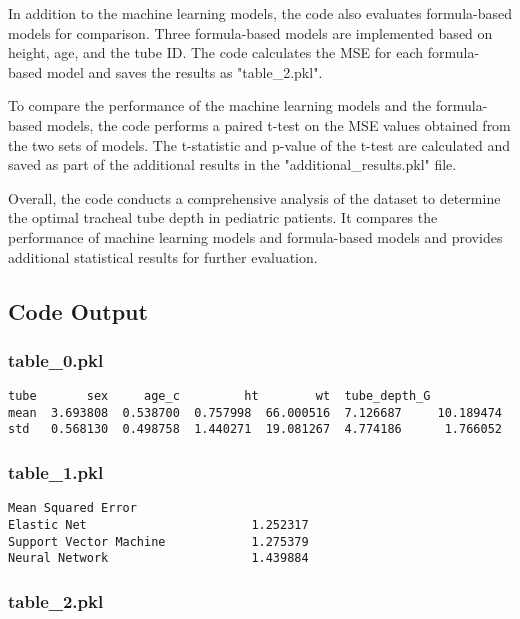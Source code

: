 \documentclass[11pt]{article}
\begin{document}
In addition to the machine learning models, the code also evaluates formula-based models for comparison. Three formula-based models are implemented based on height, age, and the tube ID. The code calculates the MSE for each formula-based model and saves the results as "table\_2.pkl".

To compare the performance of the machine learning models and the formula-based models, the code performs a paired t-test on the MSE values obtained from the two sets of models. The t-statistic and p-value of the t-test are calculated and saved as part of the additional results in the "additional\_results.pkl" file.

Overall, the code conducts a comprehensive analysis of the dataset to determine the optimal tracheal tube depth in pediatric patients. It compares the performance of machine learning models and formula-based models and provides additional statistical results for further evaluation.

\subsection{Code Output}

\subsubsection*{table\_0.pkl}

\begin{Verbatim}[tabsize=4]
          tube       sex     age_c         ht        wt  tube_depth_G
mean  3.693808  0.538700  0.757998  66.000516  7.126687     10.189474
std   0.568130  0.498758  1.440271  19.081267  4.774186      1.766052
\end{Verbatim}

\subsubsection*{table\_1.pkl}

\begin{Verbatim}[tabsize=4]
                        Mean Squared Error
Elastic Net                       1.252317
Support Vector Machine            1.275379
Neural Network                    1.439884
\end{Verbatim}

\subsubsection*{table\_2.pkl}
\end{document}
